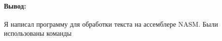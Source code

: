 \paragraph{Вывод:}
Я написал программу для обработки текста на ассемблере NASM.
Были использованы команды
